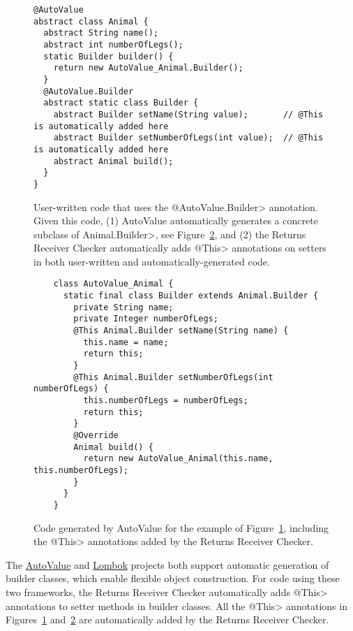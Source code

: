 
\begin{figure}
\begin{Verbatim}
@AutoValue
abstract class Animal {
  abstract String name();
  abstract int numberOfLegs();
  static Builder builder() {
    return new AutoValue_Animal.Builder();
  }
  @AutoValue.Builder
  abstract static class Builder {
    abstract Builder setName(String value);       // @This is automatically added here
    abstract Builder setNumberOfLegs(int value);  // @This is automatically added here
    abstract Animal build();
  }
}
\end{Verbatim}
    \caption{User-written code that uses the \<@AutoValue.Builder> annotation.
      Given this code,
      (1) AutoValue automatically generates a concrete subclass of
      \<Animal.Builder>, see Figure~\ref{fig-autovalue-builder-generated}, and
      (2) the Returns Receiver Checker automatically adds \<@This> annotations
      on setters in both user-written and automatically-generated code.}
    \label{fig-autovalue-builder}
\end{figure}

\begin{figure}
    \begin{Verbatim}
    class AutoValue_Animal {
      static final class Builder extends Animal.Builder {
        private String name;
        private Integer numberOfLegs;
        @This Animal.Builder setName(String name) {
          this.name = name;
          return this;
        }
        @This Animal.Builder setNumberOfLegs(int numberOfLegs) {
          this.numberOfLegs = numberOfLegs;
          return this;
        }
        @Override
        Animal build() {
          return new AutoValue_Animal(this.name, this.numberOfLegs);
        }
      }
    }
    \end{Verbatim}
    \caption{Code generated by AutoValue for the example of
    Figure~\ref{fig-autovalue-builder}, including the \<@This> annotations added
    by the Returns Receiver Checker.}
    \label{fig-autovalue-builder-generated}
\end{figure}

The \href{https://github.com/google/auto/tree/master/value}{AutoValue} and
\href{https://projectlombok.org/}{Lombok} projects both support automatic
generation of builder classes, which enable flexible object construction.
For code using these two frameworks, the Returns Receiver Checker
automatically adds \<@This> annotations to setter methods in builder
classes.  All the \<@This> annotations in
Figures~\ref{fig-autovalue-builder}
and~\ref{fig-autovalue-builder-generated} are automatically added by the
Returns Receiver Checker.
